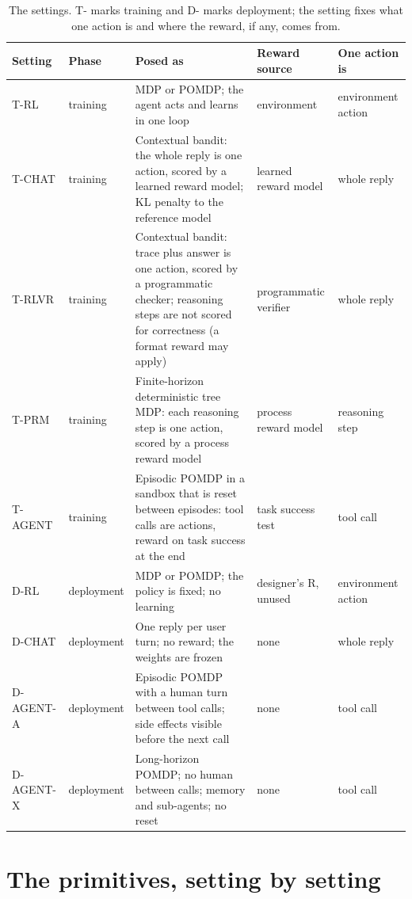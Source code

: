 \documentclass{article}
\begin{document}
\begin{table}[!htb]
\centering\small\setlength{\tabcolsep}{3pt}
\caption{The settings. T- marks training and D- marks deployment; the setting fixes what one action is and where the reward, if any, comes from.}\label{tab:settings}
\begin{tabularx}{\textwidth}{@{}ll>{\raggedright\arraybackslash}X>{\raggedright\arraybackslash}X>{\raggedright\arraybackslash}X@{}}
\toprule
Setting & Phase & Posed as & Reward source & One action is \\
\midrule
T-RL & training & MDP or POMDP; the agent acts and learns in one loop & environment & environment action \\
T-CHAT & training & Contextual bandit: the whole reply is one action, scored by a learned reward model; KL penalty to the reference model & learned reward model & whole reply \\
T-RLVR & training & Contextual bandit: trace plus answer is one action, scored by a programmatic checker; reasoning steps are not scored for correctness (a format reward may apply) & programmatic verifier & whole reply \\
T-PRM & training & Finite-horizon deterministic tree MDP: each reasoning step is one action, scored by a process reward model & process reward model & reasoning step \\
T-AGENT & training & Episodic POMDP in a sandbox that is reset between episodes: tool calls are actions, reward on task success at the end & task success test & tool call \\
D-RL & deployment & MDP or POMDP; the policy is fixed; no learning & designer's R, unused & environment action \\
D-CHAT & deployment & One reply per user turn; no reward; the weights are frozen & none & whole reply \\
D-AGENT-A & deployment & Episodic POMDP with a human turn between tool calls; side effects visible before the next call & none & tool call \\
D-AGENT-X & deployment & Long-horizon POMDP; no human between calls; memory and sub-agents; no reset & none & tool call \\
\bottomrule
\end{tabularx}
\end{table}

\hypertarget{sec:primitives}{%
\section{The primitives, setting by setting}\label{sec:primitives}}
\end{document}
